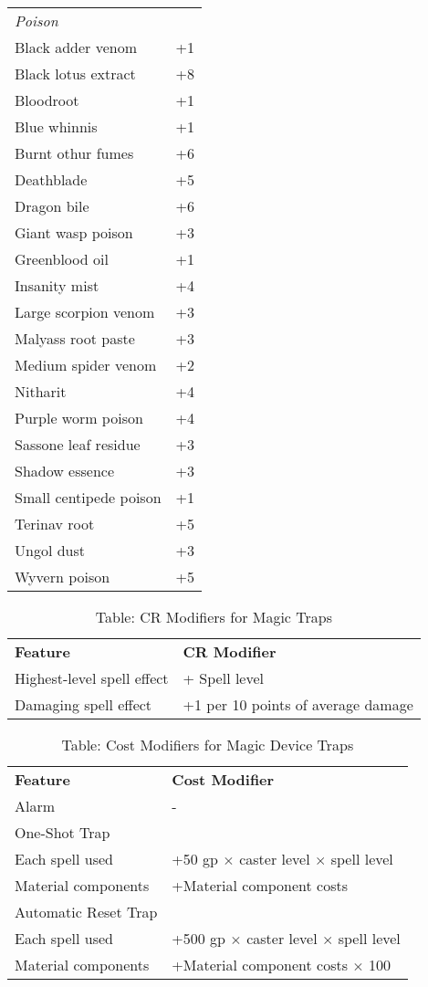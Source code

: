 \begin{table}[]
\begin{tabular}{ll}
\multicolumn{2}{l}{\textit{Poison}}\\
Black adder venom & +1\\
Black lotus extract & +8\\
Bloodroot & +1\\
Blue whinnis & +1\\
Burnt othur fumes & +6\\
Deathblade & +5\\
Dragon bile & +6\\
Giant wasp poison & +3\\
Greenblood oil & +1\\
Insanity mist & +4\\
Large scorpion venom & +3 \\
Malyass root paste & +3\\
Medium spider venom & +2\\
Nitharit & +4\\
Purple worm poison & +4\\
Sassone leaf residue & +3\\
Shadow essence & +3\\
Small centipede poison & +1\\
Terinav root & +5\\
Ungol dust & +3\\
Wyvern poison & +5\\
\end{tabular}
\end{table}

\begin{table}[]
\sffamily
\caption{Table: CR Modifiers for Magic Traps}
\begin{tabular}{ll}
\textbf{Feature} & \textbf{CR Modifier}\\
Highest-level spell effect & + Spell level \\
Damaging spell effect & +1 per 10 points of average damage\\
\end{tabular}
\end{table}

\begin{table}[]
\sffamily
\caption{Table: Cost Modifiers for Magic Device Traps}
\begin{tabular}{ll}
\textbf{Feature} & \textbf{Cost Modifier}\\
Alarm & -\\
One-Shot Trap \\
Each spell used & +50 gp $\times$ caster level $\times$ spell level\\
Material components & +Material component costs\\
Automatic Reset Trap \\
Each spell used & +500 gp $\times$ caster level $\times$ spell level\\
Material components & +Material component costs $\times$ 100\\
\end{tabular}
\end{table}

